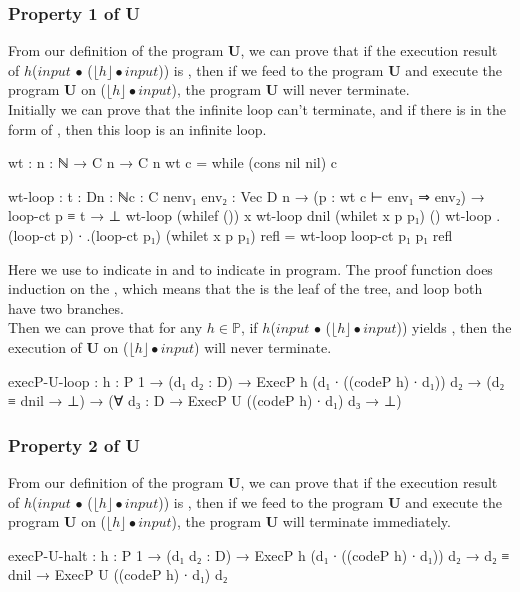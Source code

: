 \subsubsection{Property 1 of U}
From our definition of the program \textbf{U}, we can prove that if the execution result of $h$($input$ $\bullet$ ($\lfloor h\rfloor \bullet input$)) is ,
then if we feed  to the program \textbf{U} and execute the program \textbf{U} on ($\lfloor h\rfloor \bullet input$), the program \textbf{U} will never terminate.\\
Initially we can prove that the infinite loop can't terminate, and if there is  in the form of , then this  loop is an infinite loop.
\begin{code}
wt : {n : ℕ} → C n → C n
wt c = while (cons nil nil) c

wt-loop : {t : D}{n : ℕ}{c : C n}{env₁ env₂ : Vec D n} 
	  → (p : wt c ⊢ env₁ ⇒ env₂) → loop-ct p ≡ t → ⊥
wt-loop (whilef ()) x
wt-loop {dnil} (whilet x p p₁) ()
wt-loop {.(loop-ct p) ∙ .(loop-ct p₁)} (whilet x p p₁) refl 
	= wt-loop {loop-ct p₁} p₁ refl
\end{code}
Here we use  to indicate  in \WHILE and  to indicate  in \WHILE program.
The proof function does induction on the , which means that the  is the leaf of the tree,  and  loop both have two branches.\\
Then we can prove that for any $h \in \mathds{P}$, if $h$($input$ $\bullet$ ($\lfloor h\rfloor \bullet input$)) yields , then the execution of \textbf{U} on ($\lfloor h\rfloor \bullet input$) will never terminate.
\begin{code}
execP-U-loop :  {h : P 1} → (d₁ d₂ : D)
             → ExecP h (d₁ ∙ ((codeP h) ∙ d₁)) d₂
             → (d₂ ≡ dnil → ⊥)
             → (∀ {d₃ : D} → ExecP U ((codeP h) ∙ d₁) d₃ → ⊥)
\end{code}
\subsubsection{Property 2 of U}
From our definition of the program \textbf{U}, we can prove that if the execution result of $h$($input$ $\bullet$ ($\lfloor h\rfloor \bullet input$)) is ,
then if we feed  to the program \textbf{U} and execute the program \textbf{U} on ($\lfloor h\rfloor \bullet input$), the program \textbf{U} will terminate immediately.
\begin{code}
execP-U-halt :  {h : P 1} → (d₁ d₂ : D)
             → ExecP h (d₁ ∙ ((codeP h) ∙ d₁)) d₂
             → d₂ ≡ dnil
             → ExecP U ((codeP h) ∙ d₁) d₂
\end{code}
